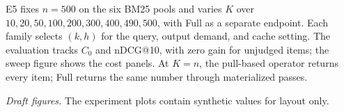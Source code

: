 E5 fixes $n=500$ on the six BM25 pools and varies $K$ over $10,20,50,100,200,300,400,490,500$, with Full as a separate endpoint.
Each family selects $(k,h)$ for the query, output demand, and cache setting. The evaluation tracks $C_0$ and nDCG@10, with zero gain for unjudged items; the sweep figure shows the cost panels. At $K=n$, the pull-based operator returns every item; Full returns the same number through materialized passes.




\noindent\textit{Draft figures.} The experiment plots contain synthetic values for layout only.

